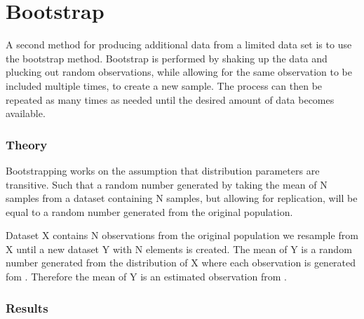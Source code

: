 \chapter{Bootstrap} \label{ch:bootstrap}

A second method for producing additional data from a limited data set is to use the bootstrap method. Bootstrap is performed by shaking up the data and plucking out random observations, while allowing for the same observation to be included multiple times, to create a new sample. The process can then be repeated as many times as needed until the desired amount of data becomes available. 

\subsection{Theory}

Bootstrapping works on the assumption that distribution parameters are transitive. Such that a random number generated by taking the mean of N samples from a dataset containing N samples, but allowing for replication, will be equal to a random number generated from the original population.

Dataset X contains N observations from the original population \phi we resample from X until a new dataset Y with N elements is created. The mean of Y is a random number generated from the distribution of X where each observation is generated fom \phi. Therefore the mean of Y is an estimated observation from \phi.

\iffalse %
Bootstrapping works by resampling the initial data with replacement, until a new data set has been created from the original. The new dataset will then contain a random sample of data with the same distribution as the original, allowing for some deviation in the parameters. By repeating this B times and averaging the distribution parameters over all B samples we get a better estimate of the original population as if we had gotten more observations.

As an example, assuming we have a normally distributed population of N elements then by taking a random resampling from that dataset until a new dataset, also containing N elements, is gained. The mean of that new dataset can then be seen as an estimated new observation from the original population. We then repeat this process B times and in the end we have a new data set of both resampled means and variances. Since both were generated using the original set of observations the set of resamples will also be normally distributed with a mean and variance close to the original population. 
\fi

\subsection{Results}



